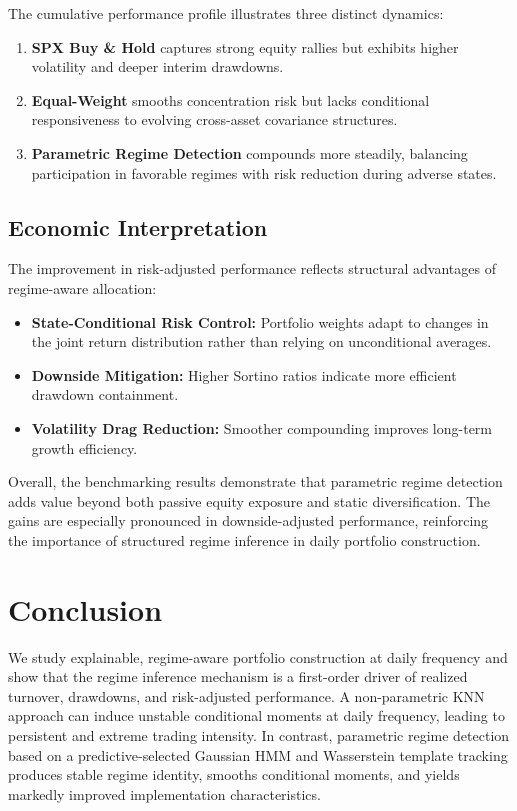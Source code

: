 \documentclass[11pt]{article}
\begin{document}
The cumulative performance profile illustrates three distinct dynamics:

\begin{enumerate}
    \item \textbf{SPX Buy \& Hold} captures strong equity rallies but exhibits higher volatility and deeper interim drawdowns.
    
    \item \textbf{Equal-Weight} smooths concentration risk but lacks conditional responsiveness to evolving cross-asset covariance structures.
    
    \item \textbf{Parametric Regime Detection} compounds more steadily, balancing participation in favorable regimes with risk reduction during adverse states.
\end{enumerate}

\subsection{Economic Interpretation}

The improvement in risk-adjusted performance reflects structural advantages of regime-aware allocation:

\begin{itemize}
    \item \textbf{State-Conditional Risk Control:} Portfolio weights adapt to changes in the joint return distribution rather than relying on unconditional averages.
    \item \textbf{Downside Mitigation:} Higher Sortino ratios indicate more efficient drawdown containment.
    \item \textbf{Volatility Drag Reduction:} Smoother compounding improves long-term growth efficiency.
\end{itemize}

Overall, the benchmarking results demonstrate that parametric regime detection adds value beyond both passive equity exposure and static diversification. The gains are especially pronounced in downside-adjusted performance, reinforcing the importance of structured regime inference in daily portfolio construction.
\section{Conclusion}

We study explainable, regime-aware portfolio construction at daily frequency and show that the regime inference mechanism is a first-order driver
of realized turnover, drawdowns, and risk-adjusted performance.
A non-parametric KNN approach can induce unstable conditional moments at daily frequency, leading to persistent and extreme trading intensity.
In contrast, parametric regime detection based on a predictive-selected Gaussian HMM and Wasserstein template tracking produces stable regime identity,
smooths conditional moments, and yields markedly improved implementation characteristics.
\end{document}
